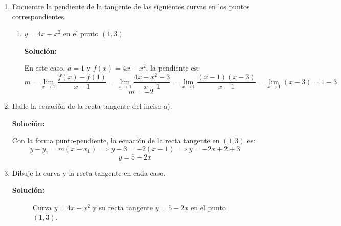 \documentclass[12pt]{article}
\newcommand{\solucion}{%
    \vspace{0.8em}%
    \textbf{Solución:}%
}
\begin{document}
\begin{enumerate}[label=\alph*.-]
    \item Encuentre la pendiente de la tangente de las siguientes curvas en los puntos correspondientes.

    \begin{enumerate}[label=\roman*.-]
        \item $y = 4x - x^2$ en el punto $(1, 3)$

        \solucion
        En este caso, $a = 1$ y $f(x) = 4x - x^2$, la pendiente es:
        \[
        m = \lim_{x \to 1} \frac{f(x) - f(1)}{x - 1}
        = \lim_{x \to 1} \frac{4x - x^2 - 3}{x - 1}
        = \lim_{x \to 1} \frac{(x-1)(x-3)}{x-1}
        = \lim_{x \to 1} (x - 3) = 1 - 3
        \]
        \[
        \boxed{m = -2}
        \]

    \end{enumerate}

    \item Halle la ecuación de la recta tangente del inciso a).

    \solucion
    Con la forma punto-pendiente, la ecuación de la recta tangente en $(1, 3)$ es:
    \[
    y - y_1 = m(x - x_1) \implies y - 3 = -2(x - 1) \implies y = -2x + 2 + 3
    \]
    \[
    \boxed{y = 5 - 2x}
    \]

    \item Dibuje la curva y la recta tangente en cada caso.

    \solucion
    \begin{figure}[H]
        \centering
        \caption{Curva $y = 4x - x^2$ y su recta tangente $y = 5 - 2x$ en el punto $(1, 3)$.}
        \label{fig:tangente-1ai}
    \end{figure}

\end{enumerate}
\end{document}
